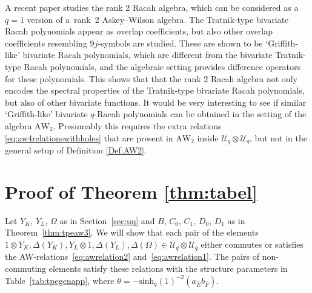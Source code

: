 \documentclass[10pt,a4paper]{amsart}
\numberwithin{equation}{section}
\newcommand{\AW}[1]{\mathrm{AW}_{#1}}
\newcommand{\dyone}{\Delta\left(Y_{L}\right)}
\newcommand{\dyzero}{\Delta\left(Y_{K}\right)}
\newcommand{\shq}{\mathrm{sinh}_q}
\newcommand{\Uq}{\mathcal{U}_q}
\newcommand{\yone}{Y_{L}\otimes 1}
\newcommand{\yzero}{1\otimes Y_{K}}
\begin{document}
\begin{Remark}
	A recent paper \cite{CFR} studies the rank 2 Racah algebra, which can be considered as a~$q=1$ version of a~rank~2 Askey--Wilson algebra. The Tratnik-type bivariate Racah polynomials appear as overlap coefficients, but also other overlap coefficients resembling $9j$-symbols are studied. These are shown to be `Griffith-like' bivariate Racah polynomials, which are different from the bivariate Tratnik-type Racah polynomials, and the algebraic setting provides difference operators for these polynomials. This shows that that the rank 2 Racah algebra not only encodes the spectral properties of the Tratnik-type bivariate Racah polynomials, but also of other bivariate functions. It would be very interesting to see if similar `Griffith-like' bivariate $q$-Racah polynomials can be obtained in the setting of the algebra $\AW{2}$. Presumably this requires the extra relations \eqref{eq:aw4relationswithholes} that are present in $\AW{2}$ inside $\Uq\otimes\Uq$, but not in the general setup of Definition \ref{Def:AW2}.
\end{Remark}

\appendix

\section{Proof of Theorem \ref{thm:tabel}}\label{app:uquqbivaraw}
Let $Y_K$, $Y_L$, $\Omega$ as in Section~\ref{sec:uq} and $B$, $C_0$, $C_1$, $D_0$, $D_1$ as in Theorem~\ref{thm:tpeaw3}. We will show that each pair of the elements $\yzero, \dyzero, \yone, \dyone, \Delta(\Omega)\in\Uq\otimes\Uq$ either commutes or satisfies the AW-relations~\eqref{eq:awrelation2} and~\eqref{eq:awrelation1}. The pairs of non-commuting elements satisfy these relations with the structure parameters in
Table~\ref{tab:tpegenapp}, where $\theta=-\shq(1)^{-2}(a_{\hat{E}}b_{\hat{F}})$.
\end{document}
